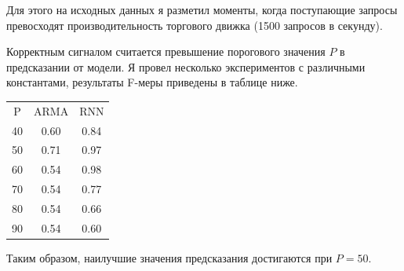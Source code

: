 Для этого на исходных данных я разметил моменты, когда поступающие запросы превосходят производительность торгового движка (1500 запросов в секунду).

Корректным сигналом считается превышение порогового значения $P$ в предсказании от модели. Я провел несколько экспериментов с различными константами, результаты F-меры приведены в таблице ниже.


\begin{center}
\begin{tabular}{ c c c }
 P & ARMA & RNN \\ 
40 & 0.60 & 0.84 \\
50 & 0.71 & 0.97 \\
60 & 0.54 & 0.98 \\
70 & 0.54 & 0.77 \\
80 & 0.54 & 0.66 \\
90 & 0.54 & 0.60 \\
\end{tabular}
\end{center}

Таким образом, наилучшие значения предсказания достигаются при $P = 50$.

\newpage